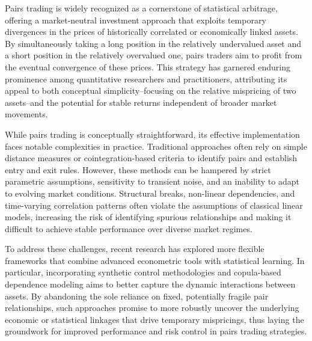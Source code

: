 

Pairs trading is widely recognized as a cornerstone of statistical arbitrage, offering a market-neutral investment approach that exploits temporary divergences in the prices of historically correlated or economically linked assets.
%
%
By simultaneously taking a long position in the relatively undervalued asset and a short position in the relatively overvalued one, pairs traders aim to profit from the eventual convergence of these prices. This strategy has garnered enduring prominence among quantitative researchers and practitioners, attributing its appeal to both conceptual simplicity--focusing on the relative mispricing of two assets--and the potential for stable returns independent of broader market movements.


While pairs trading is conceptually straightforward, its effective implementation faces notable complexities in practice. Traditional approaches often rely on simple distance measures or cointegration-based criteria to identify pairs and establish entry and exit rules. However, these methods can be hampered by strict parametric assumptions, sensitivity to transient noise, and an inability to adapt to evolving market conditions. Structural breaks, non-linear dependencies, and time-varying correlation patterns often violate the assumptions of classical linear models, increasing the risk of identifying spurious relationships and making it difficult to achieve stable performance over diverse market regimes.

To address these challenges, recent research has explored more flexible frameworks that combine advanced econometric tools with statistical learning. In particular, incorporating synthetic control methodologies and copula-based dependence modeling aims to better capture the dynamic interactions between assets. By abandoning the sole reliance on fixed, potentially fragile pair relationships, such approaches promise to more robustly uncover the underlying economic or statistical linkages that drive temporary mispricings, thus laying the groundwork for improved performance and risk control in pairs trading strategies.


